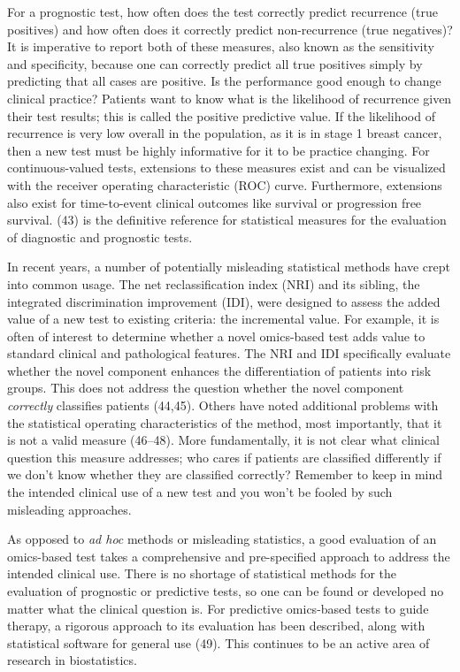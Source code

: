 \documentclass[11pt]{article}
\begin{document}
For a prognostic test, how often does the test correctly predict
recurrence (true positives) and how often does it correctly predict
non-recurrence (true negatives)? It is imperative to report both of
these measures, also known as the sensitivity and specificity, because
one can correctly predict all true positives simply by predicting that
all cases are positive. Is the performance good enough to change
clinical practice? Patients want to know what is the likelihood of
recurrence given their test results; this is called the positive
predictive value. If the likelihood of recurrence is very low overall in
the population, as it is in stage 1 breast cancer, then a new test must
be highly informative for it to be practice changing. For
continuous-valued tests, extensions to these measures exist and can be
visualized with the receiver operating characteristic (ROC) curve.
Furthermore, extensions also exist for time-to-event clinical outcomes
like survival or progression free survival. (43) is the definitive
reference for statistical measures for the evaluation of diagnostic and
prognostic tests.

In recent years, a number of potentially misleading statistical methods
have crept into common usage. The net reclassification index (NRI) and
its sibling, the integrated discrimination improvement (IDI), were
designed to assess the added value of a new test to existing criteria:
the incremental value. For example, it is often of interest to determine
whether a novel omics-based test adds value to standard clinical and
pathological features. The NRI and IDI specifically evaluate whether the
novel component enhances the differentiation of patients into risk
groups. This does not address the question whether the novel component
\emph{correctly} classifies patients (44,45). Others have noted
additional problems with the statistical operating characteristics of
the method, most importantly, that it is not a valid measure (46--48).
More fundamentally, it is not clear what clinical question this measure
addresses; who cares if patients are classified differently if we don't
know whether they are classified correctly? Remember to keep in mind the
intended clinical use of a new test and you won't be fooled by such
misleading approaches.

As opposed to \emph{ad hoc} methods or misleading statistics, a good
evaluation of an omics-based test takes a comprehensive and
pre-specified approach to address the intended clinical use. There is no
shortage of statistical methods for the evaluation of prognostic or
predictive tests, so one can be found or developed no matter what the
clinical question is. For predictive omics-based tests to guide therapy,
a rigorous approach to its evaluation has been described, along with
statistical software for general use (49). This continues to be an
active area of research in biostatistics.
\end{document}

